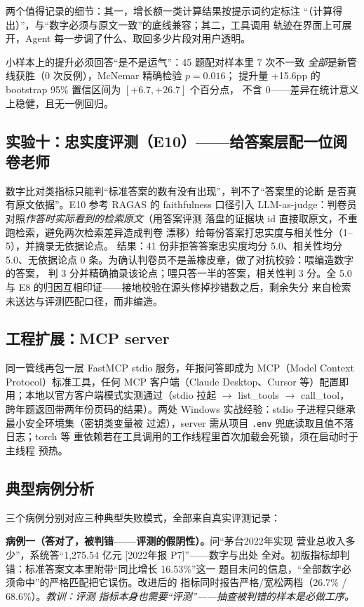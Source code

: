 \documentclass[UTF8,11pt]{ctexart}
\begin{document}
两个值得记录的细节：其一，增长额一类计算结果按提示词约定标注
``（计算得出）''，与``数字必须与原文一致''的底线兼容；其二，工具调用
轨迹在界面上可展开，Agent 每一步调了什么、取回多少片段对用户透明。

小样本上的提升必须回答``是不是运气''：45 题配对样本里 7 次不一致
\emph{全部}是新管线获胜（0 次反例），McNemar 精确检验 $p=0.016$；
提升量 +15.6pp 的 bootstrap 95\% 置信区间为 $[+6.7, +26.7]$ 个百分点，
不含 0——差异在统计意义上稳健，且无一例回归。

\subsection{实验十：忠实度评测（E10）——给答案层配一位阅卷老师}

数字比对类指标只能判``标准答案的数有没有出现''，判不了``答案里的论断
是否真有原文依据''。E10 参考 RAGAS 的 faithfulness 口径引入
LLM-as-judge：判卷员对照\emph{作答时实际看到的检索原文}（用答案评测
落盘的证据块 id 直接取原文，不重跑检索，避免两次检索差异造成判卷
漂移）给每份答案打忠实度与相关性分（1--5），并摘录无依据论点。
结果：41 份非拒答答案忠实度均分 5.0、相关性均分 5.0、无依据论点
0 条。为确认判卷员不是盖橡皮章，做了对抗校验：喂编造数字的答案，
判 3 分并精确摘录该论点；喂只答一半的答案，相关性判 3 分。全 5.0
与 E8 的归因互相印证——接地校验在源头修掉抄错数之后，剩余失分
来自检索未送达与评测匹配口径，而非编造。

\subsection{工程扩展：MCP server}

同一管线再包一层 FastMCP stdio 服务，年报问答即成为 MCP（Model
Context Protocol）标准工具，任何 MCP 客户端（Claude Desktop、Cursor
等）配置即用；本地以官方客户端模式实测通过（stdio 拉起 $\to$
list\_tools $\to$ call\_tool，跨年题返回带两年份页码的结果）。两处
Windows 实战经验：stdio 子进程只继承最小安全环境集（密钥类变量被
过滤），server 需从项目 \texttt{.env} 兜底读取且值不落日志；torch 等
重依赖若在工具调用的工作线程里首次加载会死锁，须在启动时于主线程
预热。

\subsection{典型病例分析}

三个病例分别对应三种典型失败模式，全部来自真实评测记录：

\textbf{病例一（答对了，被判错——评测的假阴性）。}问``茅台2022年实现
营业总收入多少''，系统答``1,275.54 亿元 [2022年报 P7]''——数字与出处
全对。初版指标却判错：标准答案文本里附带``同比增长 16.53\%''这一
题目未问的信息，``全部数字必须命中''的严格匹配把它误伤。改进后的
指标同时报告严格/宽松两档（26.7\% / 68.6\%）。\emph{教训：评测
指标本身也需要``评测''——抽查被判错的样本是必做工序。}
\end{document}
